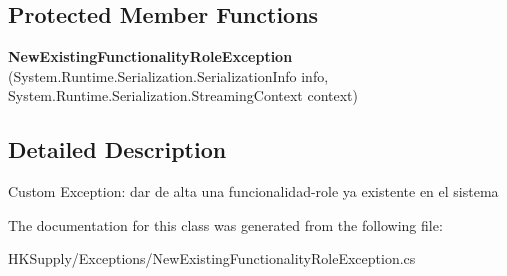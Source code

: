 \subsection*{Protected Member Functions}
\begin{DoxyCompactItemize}
\item 
\mbox{\label{class_h_k_supply_1_1_exceptions_1_1_new_existing_functionality_role_exception_aa5ab783d50373a4cc5e74bdb0d69a169}} 
{\bfseries New\+Existing\+Functionality\+Role\+Exception} (System.\+Runtime.\+Serialization.\+Serialization\+Info info, System.\+Runtime.\+Serialization.\+Streaming\+Context context)
\end{DoxyCompactItemize}


\subsection{Detailed Description}
Custom Exception\+: dar de alta una funcionalidad-\/role ya existente en el sistema 



The documentation for this class was generated from the following file\+:\begin{DoxyCompactItemize}
\item 
H\+K\+Supply/\+Exceptions/New\+Existing\+Functionality\+Role\+Exception.\+cs\end{DoxyCompactItemize}
